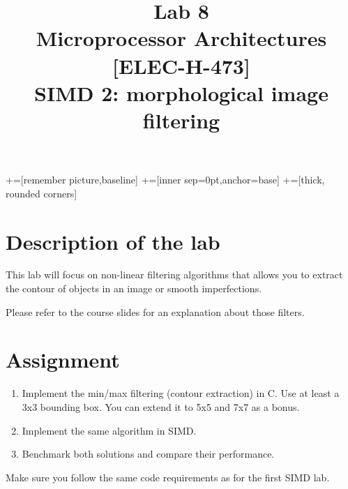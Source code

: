 \documentclass[10pt,a4paper]{article}
\date{\vspace{-1cm}\version}
\title{\vspace{-2cm} Lab 8\\ Microprocessor Architectures [ELEC-H-473]\\ SIMD 2: morphological image filtering \ifthenelse{\boolean{corrige}}{~\\Corrigé}{}}
\theoremstyle{definition}%
\begin{document}
\newcommand\tabnode[1]{\addtocounter{nodecount}{1} \tikz \node (\arabic{nodecount}) {#1};}

+=[remember picture,baseline]
+=[inner sep=0pt,anchor=base]
+=[thick, rounded corners]



\maketitle
\section*{Description of the lab}
This lab will focus on non-linear filtering algorithms that allows you to extract the contour of objects in an image or smooth imperfections.


Please refer to the course slides for an explanation about those filters.

\section*{Assignment}
\begin{enumerate}
	\item Implement the min/max filtering (contour extraction) in C.
	Use at least a 3x3 bounding box. You can extend it to 5x5 and 7x7 as a bonus.
	\item Implement the same algorithm in SIMD.
	\item Benchmark both solutions and compare their performance.
\end{enumerate}

Make sure you follow the same code requirements as for the first SIMD lab.
\end{document}
